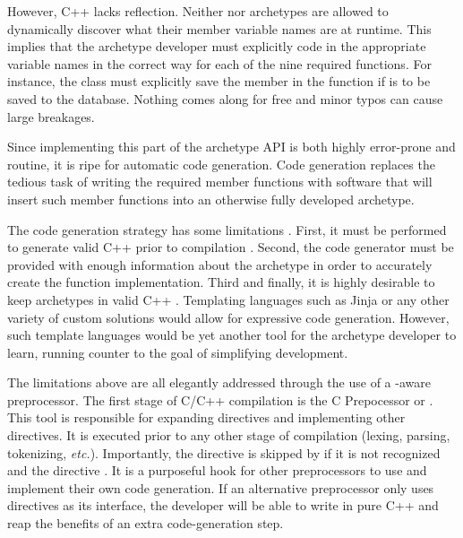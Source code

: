 However, C++ lacks reflection. Neither  nor archetypes are allowed
to dynamically discover what their member variable names are at runtime.  This 
implies that the archetype developer must explicitly code in the appropriate variable
names in the correct way for each of the nine required functions.  For instance, 
the  class must explicitly save the  member in the 
 function if  is to be saved to the database.
Nothing comes along for free and minor typos can cause large breakages. 

Since implementing this part of the archetype \gls{API} is both highly error-prone and 
routine, it is ripe for automatic code generation. Code generation replaces the 
tedious task of writing the required member functions with software that will 
insert such member functions into an otherwise fully developed archetype. 

The code generation strategy has some limitations . First, it must be 
performed to generate valid C++ prior to compilation . Second, the
code generator must be provided with enough information about the archetype in 
order to accurately create the function implementation. Third and finally, it 
is highly desirable to keep archetypes in valid C++ . Templating languages 
such as Jinja  or any other variety of custom solutions would allow for 
expressive code generation. However, such template languages would be yet another 
tool for the archetype developer to learn, running counter to the goal of 
simplifying development.

The limitations above are all elegantly addressed through the use of a 
\cyclus-aware preprocessor. The first stage of C/C++ compilation is the 
C Prepocessor or  . This tool is responsible for expanding 
 directives and implementing other \code{#} directives. It is executed
prior to any other stage of compilation (lexing, parsing, tokenizing, \emph{etc.}).
Importantly, the  directive is skipped by  if it is not 
recognized and the directive .  It is a
purposeful hook for other preprocessors to use and implement their own code generation.
If an alternative preprocessor only uses  directives as its interface, 
the developer will be able to write in pure C++ and reap the benefits
of an extra code-generation step. 


